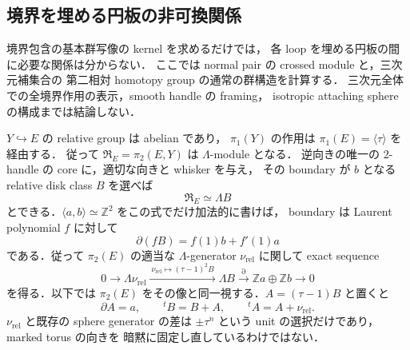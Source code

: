 \subsection{境界を埋める円板の非可換関係}
\label{tnc:relative-disk-extension}

境界包含の基本群写像の kernel を求めるだけでは，
各 loop を埋める円板の間に必要な関係は分からない．
ここでは normal pair の crossed module と，三次元補集合の
第二相対 homotopy group の通常の群構造を計算する．
三次元全体での全境界作用の表示，smooth handle の framing，
isotropic attaching sphere の構成までは結論しない．

\begin{theorem}
\label{tnc:normal-relative-disk-module}
$Y\hookrightarrow E$ の relative group は abelian であり，
$\pi_1(Y)$ の作用は $\pi_1(E)=\langle\tau\rangle$ を経由する．
従って $\mathfrak R_E=\pi_2(E,Y)$ は $\Lambda$-module となる．
逆向きの唯一の $2$-handle の core に，適切な向きと whisker を与え，
その boundary が $b$ となる relative disk class $B$ を選べば
\[
 \mathfrak R_E\simeq\Lambda B
\]
とできる．$\langle a,b\rangle\simeq\mathbb Z^2$ をこの式でだけ加法的に書けば，
boundary は Laurent polynomial $f$ に対して
\[
 \partial(fB)=f(1)b+f'(1)a
\]
である．従って $\pi_2(E)$ の適当な $\Lambda$-generator
$\nu_{\mathrm{rel}}$ に関して exact sequence
\[
 0\longrightarrow\Lambda\nu_{\mathrm{rel}}
   \xrightarrow{\ \nu_{\mathrm{rel}}\mapsto(\tau-1)^2B\ }
   \Lambda B\xrightarrow{\partial}\mathbb Z a\oplus\mathbb Z b
   \longrightarrow0
\]
を得る．以下では $\pi_2(E)$ をその像と同一視する．$A=(\tau-1)B$ と置くと
\[
 \partial A=a,\qquad
 {}^tB=B+A,\qquad {}^tA=A+\nu_{\mathrm{rel}}.
\]
$\nu_{\mathrm{rel}}$ と既存の sphere generator の差は
$\pm\tau^n$ という unit の選択だけであり，marked torus の向きを
暗黙に固定し直しているわけではない．
\end{theorem}
